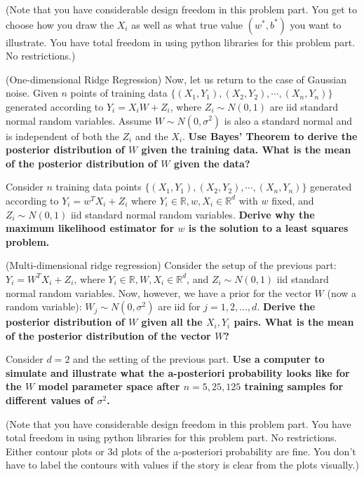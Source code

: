 \begin{Parts}
(Note that you have considerable design freedom in this problem
part. You get to choose how you draw the $X_i$ as well as what true
value $(w^*,b^*)$ you want to illustrate. You have total freedom in
using python libraries for this problem part. No restrictions.) 


\Part (One-dimensional Ridge Regression) Now, let us return to the
case of Gaussian noise. Given $n$ points of training data
$\{(X_1,Y_1),(X_2,Y_2),\cdots, (X_n,Y_n)\}$ generated according to
$Y_i=X_i W+Z_i$, where $Z_i \sim N(0,1)$ are iid standard normal random
variables. Assume $W \sim N(0,\sigma^2)$ is also a standard normal and
is independent of both the $Z_i$ and the $X_i$.
{\bf Use Bayes' Theorem to derive the posterior distribution of $W$
  given the training data. What is the mean of the posterior distribution of $W$ given the data?}




\Part Consider $n$ training
data points $\{(X_1,Y_1),(X_2,Y_2),\cdots, (X_n,Y_n)\}$ generated
according to $Y_i=w^TX_i+Z_i$ where $Y_i\in\mathbb{R},w,X_i
\in\mathbb{R}^d$ with $w$ fixed, and $Z_i \sim N(0,1)$ iid standard
normal random variables.  {\bf Derive why the maximum likelihood estimator
 for $w$ is the solution to a least squares problem.} 





\Part (Multi-dimensional ridge regression) Consider the setup of the
previous part: $Y_i=W^TX_i+Z_i$, where $Y_i\in\mathbb{R},W,X_i
\in\mathbb{R}^d$, and $Z_i \sim N(0,1)$ iid standard
normal random variables. Now, however, we have a prior for the vector $W$ (now a
random variable): $W_j\sim N(0,\sigma^2)$ are iid for $j=1,2,\ldots,d$.  {\bf Derive the posterior
  distribution of $W$ given all the $X_i,Y_i$ pairs. What is the mean of the
  posterior distribution of the vector $W$?} 



\Part Consider $d=2$ and the setting of the previous part. {\bf Use a
  computer to simulate and illustrate what the a-posteriori
  probability looks like for the $W$ model parameter space after $n=5,
  25, 125$ training samples for different values of
  $\sigma^2$. } 

(Note that you have considerable design freedom in this problem
part. You have total freedom in using python libraries for this
problem part. No restrictions. Either contour plots or 3d plots of the
a-posteriori probability are fine. You don't have to label the
contours with values if the story is clear from the plots visually.)  


\end{Parts}

